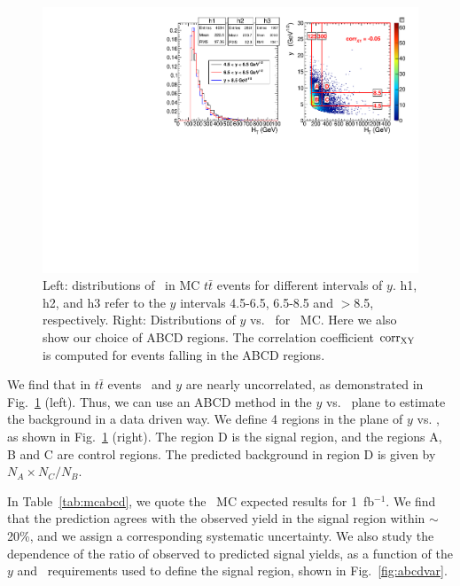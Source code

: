 \begin{figure}[hbt]
\begin{center}
\includegraphics[width=1\linewidth]{plots/abcd_tt.pdf}
\caption{\label{fig:uncor}\protect 
Left: distributions of \Ht\ 
in MC $t\bar{t}$ events for different intervals of $y$. 
h1, h2, and h3 refer to the $y$ intervals 4.5-6.5, 6.5-8.5 and $>$8.5, respectively. Right: 
Distributions of $y$ vs. 
\Ht\ for \ttbar\ MC.  Here we also show our choice of ABCD regions. The correlation coefficient
${\rm corr_{XY}}$ is computed for events falling in the ABCD regions.
}
\end{center}
\end{figure}

We find that in $t\bar{t}$ events \Ht\ and 
$y$ are nearly uncorrelated, 
as demonstrated in Fig.~\ref{fig:uncor} (left).
Thus, we can use an ABCD method in the $y$ vs. \Ht\
plane to estimate the background in a data driven way. We define 4 regions in the 
plane of $y$ vs. \Ht, as shown in Fig.~\ref{fig:uncor} (right).
The region D is the signal region, and the regions A, B and C are control regions.
The predicted background in region D is given by $N_A \times N_C / N_B$.

In Table~\ref{tab:mcabcd}, we quote the \ttbar\ MC expected results for 1~fb$^{-1}$. We 
find that the prediction agrees with the observed yield in the signal region within
$\sim$20\%, and we assign a corresponding systematic uncertainty. We also study the dependence of the ratio
of observed to predicted signal yields, as a function of the $y$ and \Ht\
requirements used to define the signal region, shown in Fig.~\ref{fig:abcdvar}.

